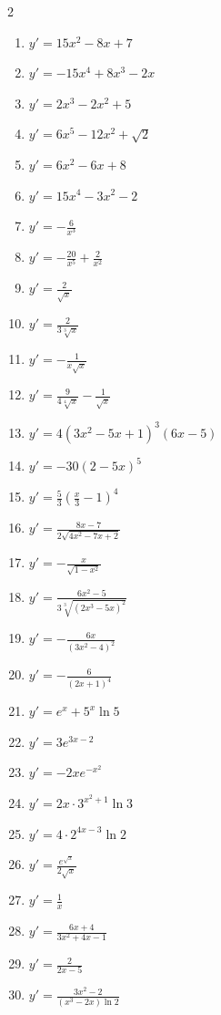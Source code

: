 \documentclass[11pt,a4paper]{article}
\begin{document}
\pagestyle{empty}

\begin{multicols}{2}
\begin{enumerate}[label=\textbf{\arabic*.}, leftmargin=2em, itemsep=10pt]
    \item $y' = 15x^2 - 8x + 7$
    \item $y' = -15x^4 + 8x^3 - 2x$
    \item $y' = 2x^3 - 2x^2 + 5$
    \item $y' = 6x^5 - 12x^2 + \sqrt{2}$
    \item $y' = 6x^2 - 6x + 8$
    \item $y' = 15x^4 - 3x^2 - 2$
    \item $y' = -\frac{6}{x^3}$
    \item $y' = -\frac{20}{x^5} + \frac{2}{x^2}$
    \item $y' = \frac{2}{\sqrt{x}}$
    \item $y' = \frac{2}{3\sqrt[3]{x}}$
    \item $y' = -\frac{1}{x\sqrt{x}}$
    \item $y' = \frac{9}{4\sqrt[4]{x}} - \frac{1}{\sqrt{x}}$
    \item $y' = 4(3x^2 - 5x + 1)^3(6x - 5)$
    \item $y' = -30(2 - 5x)^5$
    \item $y' = \frac{5}{3}\left(\frac{x}{3} - 1\right)^4$
    \item $y' = \frac{8x - 7}{2\sqrt{4x^2 - 7x + 2}}$
    \item $y' = -\frac{x}{\sqrt{1 - x^2}}$
    \item $y' = \frac{6x^2 - 5}{3\sqrt[3]{(2x^3 - 5x)^2}}$
    \item $y' = -\frac{6x}{(3x^2 - 4)^2}$
    \item $y' = -\frac{6}{(2x+1)^4}$
    \item $y' = e^x + 5^x \ln 5$
    \item $y' = 3e^{3x - 2}$
    \item $y' = -2x e^{-x^2}$
    \item $y' = 2x \cdot 3^{x^2 + 1} \ln 3$
    \item $y' = 4 \cdot 2^{4x - 3} \ln 2$
    \item $y' = \frac{e^{\sqrt{x}}}{2\sqrt{x}}$
    \item $y' = \frac{1}{x}$
    \item $y' = \frac{6x + 4}{3x^2 + 4x - 1}$
    \item $y' = \frac{2}{2x - 5}$
    \item $y' = \frac{3x^2 - 2}{(x^3 - 2x)\ln 2}$
\end{enumerate}
\end{multicols}
\end{document}
